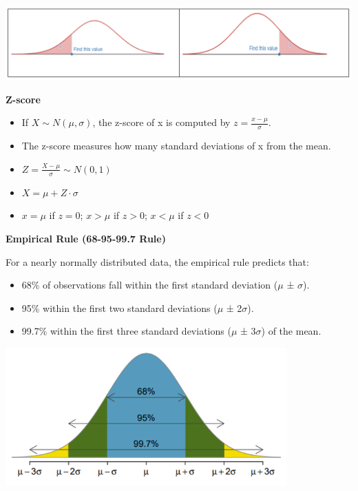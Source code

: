 \documentclass[
]{book}
\providecommand{\tightlist}{%
  \setlength{\itemsep}{0pt}\setlength{\parskip}{0pt}}
\begin{document}
\includegraphics[width=5.72917in,height=\textheight]{images/img46.png}

\textbf{Z-score}

\begin{itemize}
\tightlist
\item
  If \(X \sim N(\mu, \sigma)\), the z-score of x is computed by \(z = \frac{x - \mu}{\sigma}\).
\item
  The z-score measures how many standard deviations of x from the mean.
\item
  \(Z = \frac{X - \mu}{\sigma} \sim N(0, 1)\)
\item
  \(X = \mu + Z \cdot \sigma\)
\item
  \(x = \mu\) if \(z = 0\); \(x > \mu\) if \(z > 0\); \(x < \mu\) if \(z < 0\)
\end{itemize}

\textbf{Empirical Rule (68-95-99.7 Rule)}

For a nearly normally distributed data, the empirical rule predicts that:

\begin{itemize}
\tightlist
\item
  68\% of observations fall within the first standard deviation (\(\mu\) ± \(\sigma\)).
\item
  95\% within the first two standard deviations (\(\mu\) ± 2\(\sigma\)).
\item
  99.7\% within the first three standard deviations (\(\mu\) ± 3\(\sigma\)) of the mean.
\end{itemize}

\includegraphics[width=4.25in,height=\textheight]{images/img47.png}
\end{document}
